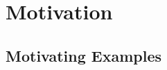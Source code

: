 \section{Motivation}
\label{motiv:sec}

\subsection{Motivating Examples}
\label{examples:sec}






